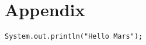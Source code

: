 \chapter{Appendix}

\begin{lstlisting}[caption={Source code of something},label=Listing]
System.out.println("Hello Mars");
\end{lstlisting}

